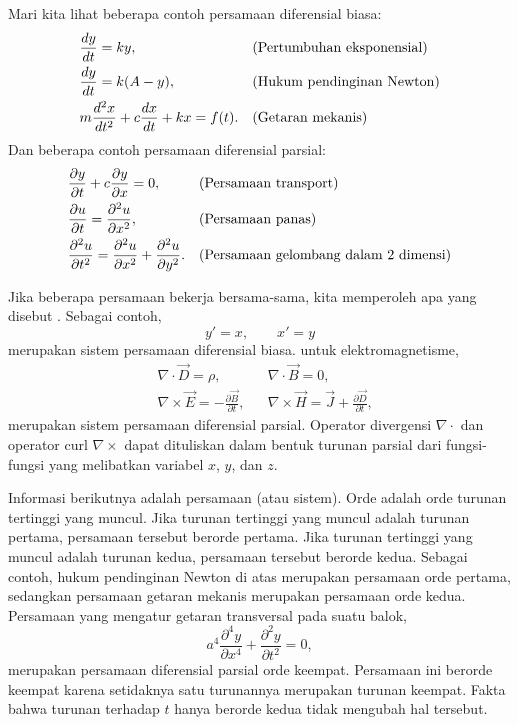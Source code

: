 Mari kita lihat beberapa contoh persamaan diferensial biasa:
\begin{align*}
& \frac{d y}{dt} = ky , & & \text{(Pertumbuhan eksponensial\index{pertumbuhan eksponensial})} \\
& \frac{d y}{dt} = k(A-y) , & & \text{(\myindex{Hukum pendinginan Newton})} \\
& m \frac{d^2 x}{dt^2} + c \frac{dx}{dt} + kx = f(t) . & &
\text{(Getaran mekanis\index{getaran mekanis})}
\end{align*}
Dan beberapa contoh persamaan diferensial parsial:
\begin{align*}
& \frac{\partial y}{\partial t} + c \frac{\partial y}{\partial x} = 0 , & &
\text{(Persamaan transport\index{persamaan transport})} \\
& \frac{\partial u}{\partial t} = \frac{\partial^2 u}{\partial x^2} , & &
\text{(Persamaan panas\index{persamaan panas})} \\
& \frac{\partial^2 u}{\partial t^2} = \frac{\partial^2 u}{\partial x^2} +
\frac{\partial^2 u}{\partial y^2} . & &
\text{(Persamaan gelombang dalam 2 dimensi\index{persamaan gelombang dalam 2 dimensi})}
\end{align*}

Jika beberapa persamaan bekerja bersama-sama, kita memperoleh apa yang disebut
\emph{}. Sebagai contoh,
\begin{equation*}
y' = x , \qquad x' = y
\end{equation*}
merupakan sistem persamaan diferensial biasa.
 untuk elektromagnetisme,
\begin{align*}
& \nabla \cdot \vec{D} = \rho, & & \nabla \cdot \vec{B} = 0 , \\
& \nabla \times \vec{E} = - \frac{\partial \vec{B}}{\partial t}, &
& \nabla \times \vec{H} = \vec{J} + \frac{\partial \vec{D}}{\partial t} ,
\end{align*}
merupakan sistem persamaan diferensial parsial.
Operator divergensi $\nabla \cdot$ dan
operator curl $\nabla \times$ dapat dituliskan dalam bentuk turunan parsial dari
fungsi-fungsi yang melibatkan variabel $x$, $y$, dan $z$.

\medskip

Informasi berikutnya adalah \emph{} persamaan (atau sistem).
Orde adalah orde turunan tertinggi yang muncul. Jika turunan tertinggi yang muncul
adalah turunan pertama, persamaan tersebut berorde pertama. Jika turunan tertinggi
yang muncul adalah turunan kedua, persamaan tersebut berorde kedua. Sebagai contoh,
hukum pendinginan Newton di atas merupakan persamaan orde pertama, sedangkan
persamaan getaran mekanis merupakan persamaan orde kedua.
Persamaan yang mengatur getaran transversal pada suatu balok,
\begin{equation*}
a^4 \frac{\partial^4 y}{\partial x^4} + \frac{\partial^2 y}{\partial t^2} = 0,
\end{equation*}
merupakan persamaan diferensial parsial orde keempat. Persamaan ini berorde
keempat karena setidaknya satu turunannya merupakan turunan keempat. Fakta bahwa
turunan terhadap $t$ hanya berorde kedua tidak mengubah hal tersebut.


